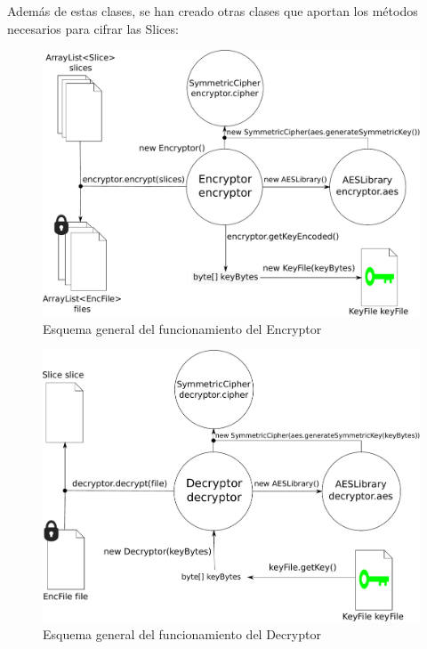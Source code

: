 Además de estas clases, se han creado otras clases que aportan los métodos
necesarios para cifrar las Slices:

\begin{figure}[!htb]
  \centering
  \includegraphics[scale=0.5]{Figures/Encryptor}
  \decoRule
  \caption[Encryptor]{Esquema general del funcionamiento del Encryptor}
  \label{fig:Encryptor}
\end{figure}

\begin{figure}[!htb]
  \centering
  \includegraphics[scale=0.5]{Figures/Decryptor}
  \decoRule
  \caption[Decryptor]{Esquema general del funcionamiento del Decryptor}
  \label{fig:Decryptor}
\end{figure}

